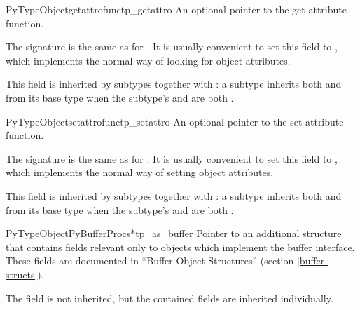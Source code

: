 \begin{cmemberdesc}{PyTypeObject}{getattrofunc}{tp_getattro}
  An optional pointer to the get-attribute function.

  The signature is the same as for .  It
  is usually convenient to set this field to
  , which implements the normal
  way of looking for object attributes.

  This field is inherited by subtypes together with
  : a subtype inherits both  and
   from its base type when the subtype's
   and  are both \NULL.
\end{cmemberdesc}

\begin{cmemberdesc}{PyTypeObject}{setattrofunc}{tp_setattro}
  An optional pointer to the set-attribute function.

  The signature is the same as for .  It
  is usually convenient to set this field to
  , which implements the normal
  way of setting object attributes.

  This field is inherited by subtypes together with
  : a subtype inherits both  and
   from its base type when the subtype's
   and  are both \NULL.
\end{cmemberdesc}

\begin{cmemberdesc}{PyTypeObject}{PyBufferProcs*}{tp_as_buffer}
  Pointer to an additional structure that contains fields relevant only to
  objects which implement the buffer interface.  These fields are
  documented in ``Buffer Object Structures'' (section
  \ref{buffer-structs}).

  The  field is not inherited, but the contained
  fields are inherited individually.
\end{cmemberdesc}

